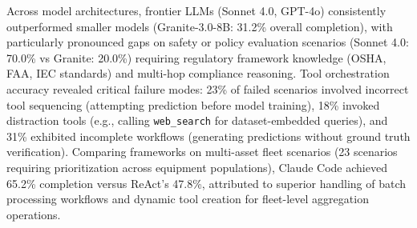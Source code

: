 \documentclass[sigconf,review]{acmart}
\begin{document}
  Across 
  model architectures, frontier LLMs (Sonnet 4.0, GPT-4o) consistently       
  outperformed smaller models (Granite-3.0-8B: 31.2\% overall completion),   
  with particularly pronounced gaps on safety or policy evaluation scenarios    
  (Sonnet 4.0: 70.0\% vs Granite: 20.0\%) requiring regulatory framework     
  knowledge (OSHA, FAA, IEC standards) and multi-hop compliance reasoning.   
  Tool orchestration accuracy revealed critical failure modes: 23\% of failed
   scenarios involved incorrect tool sequencing (attempting prediction before
   model training), 18\% invoked distraction tools (e.g., calling            
  \texttt{web\_search} for dataset-embedded queries), and 31\% exhibited     
  incomplete workflows (generating predictions without ground truth          
  verification). Comparing frameworks on multi-asset fleet scenarios (23     
  scenarios requiring prioritization across equipment populations), Claude   
  Code achieved 65.2\% completion versus ReAct's 47.8\%, attributed to       
  superior handling of batch processing workflows and dynamic tool creation  
  for fleet-level aggregation operations.                                    
                                                                             
  \begin{table}[t]
    \caption{Framework and model performance across PHM task categories.
  Completion rates represent percentage of scenarios producing valid outputs
  matching ground truth criteria. Best results per category in
  \textbf{bold}.}
    \label{tab:framework_performance}
    \centering
    \small
    \end{table}                                                              
                                                                             
\end{document}
